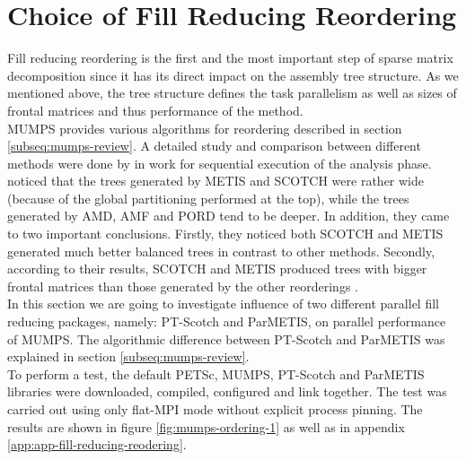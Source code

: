 \section{Choice of Fill Reducing Reordering}
\label{subseq:fill-in-reordering}

Fill reducing reordering is the first and the most important step of sparse matrix decomposition since it has its direct impact on the assembly tree structure. As we mentioned above, the tree structure defines the task parallelism as well as sizes of frontal matrices and thus performance of the method.\\


MUMPS provides various algorithms for reordering described in section \ref{subseq:mumps-review}. A detailed study and comparison between different methods were done by \citeauthor{guermouche2003memory} in work \cite{guermouche2003memory} for sequential execution of the analysis phase. \citeauthor{guermouche2003memory} noticed that the trees generated by METIS and SCOTCH were rather wide (because of the global partitioning performed at the top), while the trees generated by AMD, AMF and PORD tend to be deeper. In addition, they came to two important conclusions. Firstly, they noticed both SCOTCH and METIS generated much better balanced trees in contrast to other methods. Secondly, according to their results, SCOTCH and METIS produced trees with bigger frontal matrices than those generated by the other reorderings \cite{guermouche2003memory}.\\


In this section we are going to investigate influence of two different parallel fill reducing packages, namely: PT-Scotch and ParMETIS, on parallel performance of MUMPS. The algorithmic difference between PT-Scotch and ParMETIS was explained in section \ref{subseq:mumps-review}.\\


To perform a test, the default PETSc, MUMPS, PT-Scotch and ParMETIS libraries were downloaded, compiled, configured and link together. The test was carried out using only flat-MPI mode without explicit process pinning. The results are shown in figure \ref{fig:mumps-ordering-1} as well as in appendix \ref{app:app-fill-reducing-reodering}.\\


